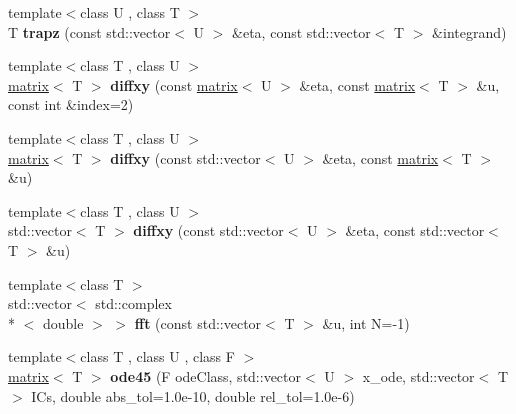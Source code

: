 \begin{DoxyCompactItemize}
\item 
\hypertarget{namespacekeycpp_af1e3b00481455a363456bcdc8ab407fb}{{\footnotesize template$<$class U , class T $>$ }\\T {\bfseries trapz} (const std\-::vector$<$ U $>$ \&eta, const std\-::vector$<$ T $>$ \&integrand)}\label{namespacekeycpp_af1e3b00481455a363456bcdc8ab407fb}

\item 
\hypertarget{namespacekeycpp_a7124131346b73357a9e7d8e7c4ae9cc9}{{\footnotesize template$<$class T , class U $>$ }\\\hyperlink{classkeycpp_1_1matrix}{matrix}$<$ T $>$ {\bfseries diffxy} (const \hyperlink{classkeycpp_1_1matrix}{matrix}$<$ U $>$ \&eta, const \hyperlink{classkeycpp_1_1matrix}{matrix}$<$ T $>$ \&u, const int \&index=2)}\label{namespacekeycpp_a7124131346b73357a9e7d8e7c4ae9cc9}

\item 
\hypertarget{namespacekeycpp_af805809516d8ef219573c6f3e4cbd077}{{\footnotesize template$<$class T , class U $>$ }\\\hyperlink{classkeycpp_1_1matrix}{matrix}$<$ T $>$ {\bfseries diffxy} (const std\-::vector$<$ U $>$ \&eta, const \hyperlink{classkeycpp_1_1matrix}{matrix}$<$ T $>$ \&u)}\label{namespacekeycpp_af805809516d8ef219573c6f3e4cbd077}

\item 
\hypertarget{namespacekeycpp_a2e73976d2cf44b145d261f52c4bcdf5f}{{\footnotesize template$<$class T , class U $>$ }\\std\-::vector$<$ T $>$ {\bfseries diffxy} (const std\-::vector$<$ U $>$ \&eta, const std\-::vector$<$ T $>$ \&u)}\label{namespacekeycpp_a2e73976d2cf44b145d261f52c4bcdf5f}

\item 
\hypertarget{namespacekeycpp_adec9b07955f64a93dc76db37eea6656d}{{\footnotesize template$<$class T $>$ }\\std\-::vector$<$ std\-::complex\\*
$<$ double $>$ $>$ {\bfseries fft} (const std\-::vector$<$ T $>$ \&u, int N=-\/1)}\label{namespacekeycpp_adec9b07955f64a93dc76db37eea6656d}

\item 
\hypertarget{namespacekeycpp_a880f7df231a78f912b3fb5d301c809f9}{{\footnotesize template$<$class T , class U , class F $>$ }\\\hyperlink{classkeycpp_1_1matrix}{matrix}$<$ T $>$ {\bfseries ode45} (F ode\-Class, std\-::vector$<$ U $>$ x\-\_\-ode, std\-::vector$<$ T $>$ I\-Cs, double abs\-\_\-tol=1.\-0e-\/10, double rel\-\_\-tol=1.\-0e-\/6)}\label{namespacekeycpp_a880f7df231a78f912b3fb5d301c809f9}


\end{DoxyCompactItemize}

